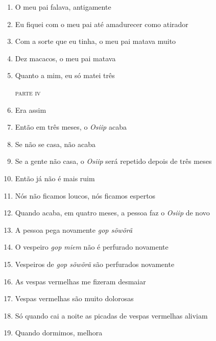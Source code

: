 \begin{enumerate}
 \begin{center}\end{center}
 
 \item O meu pai falava, antigamente
 \item Eu fiquei com o meu pai até amadurecer como atirador
 \item Com a sorte que eu tinha, o meu pai matava muito
 \item Dez macacos, o meu pai matava
 \item Quanto a mim, eu só matei três
 
 \begin{flushright}\textsc{parte iv}\end{flushright}
 
 \item Era assim
 \item Então em três meses, o \textit{Osiip} acaba
 \item Se não se casa, não acaba
 \item Se a gente não casa, o \textit{Osiip} será repetido depois de três meses
 \item Então já não é mais ruim
 \item Nós não ficamos loucos, nós ficamos espertos
 
 \begin{center}\end{center}
 
 \item Quando acaba, em quatro meses, a pessoa faz o \textit{Osiip} de novo
 \item A pessoa pega novamente \textit{gop sõwõrã}
 \item O vespeiro \textit{gop miem} não é perfurado novamente
 \item Vespeiros de \textit{gop sõwõrã} são perfurados novamente
 
 \begin{center}\end{center}
 
 \item As vespas vermelhas me fizeram desmaiar
 \item Vespas vermelhas são muito dolorosas
 \item Só quando cai a noite as picadas de vespas vermelhas aliviam
 \item Quando dormimos, melhora
 
 \begin{center}\end{center}
 

\end{enumerate}
